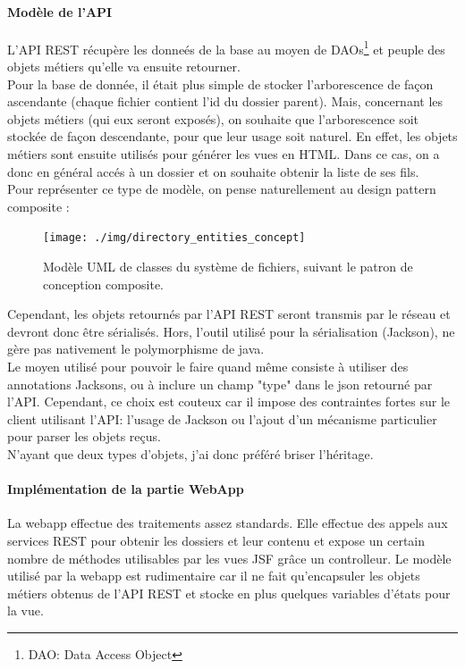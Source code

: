 \paragraph*{Modèle de l'API\\}
L'API REST récupère les donneés de la base au moyen de DAOs\footnote{DAO: Data Access Object} et peuple des objets métiers qu'elle va ensuite retourner.\\

Pour la base de donnée, il était plus simple de stocker l'arborescence de façon ascendante (chaque fichier contient l'id du dossier parent). Mais, concernant les objets métiers (qui eux seront exposés), on souhaite que l'arborescence soit stockée de façon descendante, pour que leur usage soit naturel.
En effet, les objets métiers sont ensuite utilisés pour générer les vues en HTML. Dans ce cas, on a donc en général accés à un dossier et on souhaite obtenir la liste de ses fils. \\

Pour représenter ce type de modèle, on pense naturellement au design pattern composite : \\
\begin{figure}[H]
  \centering
  \texttt{[image: ./img/directory\_entities\_concept]}
  \caption{\label{fig:mb_va_ast} Modèle UML de classes du système de fichiers, suivant le patron de conception composite.}
\end{figure}

Cependant, les objets retournés par l'API REST seront transmis par le réseau et devront donc être sérialisés. Hors, l'outil utilisé pour la sérialisation (Jackson), ne gère pas nativement le polymorphisme de java. \\
Le moyen utilisé pour pouvoir le faire quand même consiste à utiliser des annotations Jacksons, ou à inclure un champ "type" dans le json retourné par l'API. Cependant, ce choix est couteux car il impose des contraintes fortes sur le client utilisant l'API: l'usage de Jackson ou l'ajout d'un mécanisme particulier pour parser les objets reçus.\\

N'ayant que deux types d'objets, j'ai donc préféré briser l'héritage.


\paragraph*{Implémentation de la partie WebApp\\}
La webapp effectue des traitements assez standards. Elle effectue des appels aux services REST pour obtenir les dossiers et leur contenu et expose un certain nombre de méthodes utilisables par les vues JSF grâce un controlleur.
Le modèle utilisé par la webapp est rudimentaire car il ne fait qu'encapsuler les objets métiers obtenus de l'API REST et stocke en plus quelques variables d'états pour la vue.

